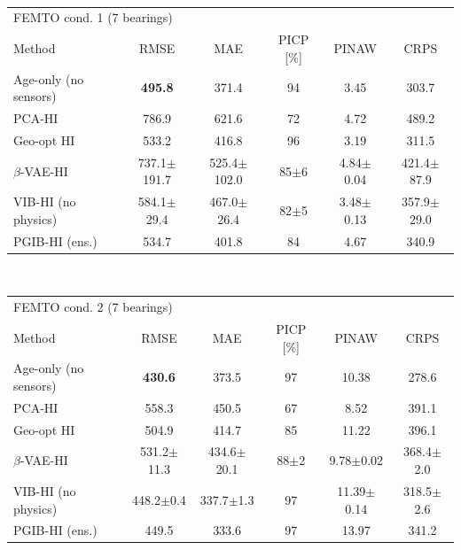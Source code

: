 \\[4pt]
\begin{tabular}{l c c c c c}
\hline
\multicolumn{6}{l}{FEMTO cond. 1 (7 bearings)}\\
 Method & RMSE & MAE & PICP [\%] & PINAW & CRPS \\
\hline
Age-only (no sensors) & \textbf{495.8} & 371.4 & 94 & 3.45 & 303.7 \\
PCA-HI & 786.9 & 621.6 & 72 & 4.72 & 489.2 \\
Geo-opt HI & 533.2 & 416.8 & 96 & 3.19 & 311.5 \\
$\beta$-VAE-HI & 737.1$\pm$191.7 & 525.4$\pm$102.0 & 85$\pm$6 & 4.84$\pm$0.04 & 421.4$\pm$87.9 \\
VIB-HI (no physics) & 584.1$\pm$29.4 & 467.0$\pm$26.4 & 82$\pm$5 & 3.48$\pm$0.13 & 357.9$\pm$29.0 \\
PGIB-HI (ens.) & 534.7 & 401.8 & 84 & 4.67 & 340.9 \\
\hline
\end{tabular}
\\[4pt]
\begin{tabular}{l c c c c c}
\hline
\multicolumn{6}{l}{FEMTO cond. 2 (7 bearings)}\\
 Method & RMSE & MAE & PICP [\%] & PINAW & CRPS \\
\hline
Age-only (no sensors) & \textbf{430.6} & 373.5 & 97 & 10.38 & 278.6 \\
PCA-HI & 558.3 & 450.5 & 67 & 8.52 & 391.1 \\
Geo-opt HI & 504.9 & 414.7 & 85 & 11.22 & 396.1 \\
$\beta$-VAE-HI & 531.2$\pm$11.3 & 434.6$\pm$20.1 & 88$\pm$2 & 9.78$\pm$0.02 & 368.4$\pm$2.0 \\
VIB-HI (no physics) & 448.2$\pm$0.4 & 337.7$\pm$1.3 & 97 & 11.39$\pm$0.14 & 318.5$\pm$2.6 \\
PGIB-HI (ens.) & 449.5 & 333.6 & 97 & 13.97 & 341.2 \\
\hline
\end{tabular}
